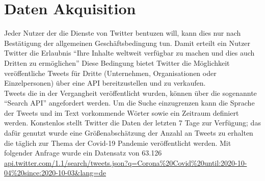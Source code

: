 \chapter{Daten Akquisition}
\label{chap:akquisition}
Jeder Nutzer der die Dienste von Twitter bentuzen will, kann dies nur nach Bestätigung der allgemeinen Geschäftsbedingung tun. Damit erteilt ein Nutzer Twitter die Erlaubnis "`Ihre Inhalte weltweit verfügbar zu machen und dies auch Dritten zu ermöglichen"'
Diese Bedingung bietet Twitter die Möglichkeit veröffentliche Tweets für Dritte (Unternehmen, Organisationen oder Einzelpersonen) über eine API bereitzustellen und zu verkaufen.\\


Tweets die in der Vergangheit veröffentlicht wurden, können über die sogenannte "`Search API"' angefordert werden. Um die Suche einzugrenzen kann die Sprache der Tweets und im Text vorkommende Wörter sowie ein Zeitraum definiert werden. 
Konstenlos stellt Twitter die Daten der letzten 7 Tage zur Verfügung; das dafür  genutzt wurde eine Größenabschätzung der Anzahl an Tweets zu erhalten die täglich zur Thema der Covid-19 Pandemie veröffentlicht werden. Mit folgender Anfrage wurde ein Datensatz von 63.126 
\url{api.twitter.com/1.1/search/tweets.json?q=Corona%20Covid%20until:2020-10-04%20since:2020-10-03&lang=de}
